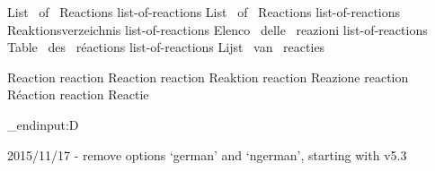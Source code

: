  {List~ of~ Reactions}
 {list-of-reactions} {List~ of~ Reactions}
  {list-of-reactions} {Reaktionsverzeichnis}
 {list-of-reactions} {Elenco~ delle~ reazioni}
  {list-of-reactions} {Table~ des~ r\'eactions}
   {list-of-reactions} {Lijst~ van~ reacties}

 {Reaction}
 {reaction} {Reaction}
  {reaction} {Reaktion}
 {reaction} {Reazione}
  {reaction} {R\'eaction}
   {reaction} {Reactie}


\tex_endinput:D

2015/11/17 - remove options `german' and `ngerman', starting with v5.3
